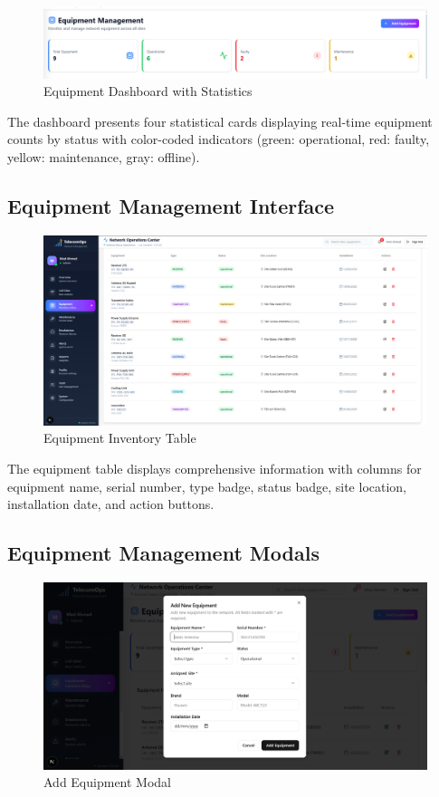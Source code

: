 \begin{figure}[H]
    \centering
    \includegraphics[width=0.8\linewidth]{img/chap_04/equipment_dashboard.png}
    \caption{Equipment Dashboard with Statistics}
    \label{fig:equipment_dashboard}
\end{figure}

The dashboard presents four statistical cards displaying real-time equipment counts by status with color-coded indicators (green: operational, red: faulty, yellow: maintenance, gray: offline).

\subsection{Equipment Management Interface}

\begin{figure}[H]
    \centering
    \includegraphics[width=0.8\linewidth]{img/chap_04/equipment_table.png}
    \caption{Equipment Inventory Table}
    \label{fig:equipment_table}
\end{figure}

The equipment table displays comprehensive information with columns for equipment name, serial number, type badge, status badge, site location, installation date, and action buttons.

\subsection{Equipment Management Modals}

\begin{figure}[H]
    \centering
    \includegraphics[width=0.6\linewidth]{img/chap_04/add_equipment_dialog.png}
    \caption{Add Equipment Modal}
    \label{fig:add_equipment_modal}
\end{figure}

